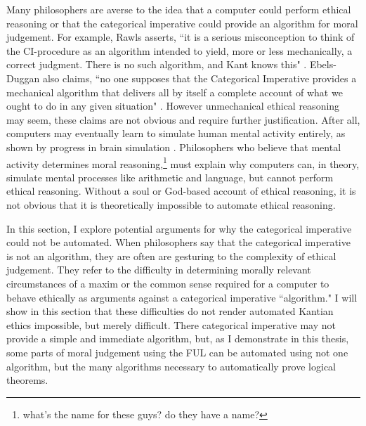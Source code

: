 %
\begin{isabellebody}%
%
%
\isadelimtheory
%
\endisadelimtheory
%
\isatagtheory
%
\endisatagtheory
{\isafoldtheory}%
%
\isadelimtheory
%
\endisadelimtheory
%
\isadelimdocument
%
\endisadelimdocument
%
\isatagdocument
%
\isamarkuptrue%
%
\endisatagdocument
{\isafolddocument}%
%
\isadelimdocument
%
\endisadelimdocument
%
\begin{isamarkuptext}%
Many philosophers are averse to the idea that a computer could perform ethical 
reasoning or that the categorical imperative could provide an algorithm for
moral judgement. For example, Rawls asserts, ``it is a serious misconception to think of the CI-procedure 
as an algorithm intended to yield, more or less mechanically, a correct judgment. There is no such 
algorithm, and Kant knows this" \citep[166]{rawlslectures}. Ebels-Duggan also claims, ``no one supposes that the Categorical
Imperative provides a mechanical algorithm that delivers all by itself a complete account of what we 
ought to do in any given situation" \citep[174]{ebelsduggan}. However unmechanical ethical reasoning
may seem, these claims are not obvious and require further justification. After all, computers may eventually 
learn to simulate human mental activity entirely, as shown by progress in brain simulation \citep{brainsimulation}. 
Philosophers who believe that mental activity determines moral reasoning,\footnote{what's the name for these
guys? do they have a name?} must explain why computers can, in theory, simulate mental processes like arithmetic 
and language, but cannot perform ethical reasoning. Without a soul or God-based account of ethical reasoning, 
it is not obvious that it is theoretically impossible to automate ethical reasoning. 

In this section,
I explore potential arguments for why the categorical imperative could not be automated. When 
philosophers say that the categorical imperative is not an algorithm, they are often are gesturing to the complexity
of ethical judgement. They refer to the difficulty in determining morally relevant circumstances of a maxim or the common 
sense required for a computer to behave ethically as arguments against a categorical imperative ``algorithm." 
I will show in this section that these difficulties do not render automated Kantian ethics impossible, but 
merely difficult. There categorical imperative may not provide a simple and immediate algorithm, but, as
I demonstrate in this thesis, some parts of moral judgement using the FUL can be automated using not one
algorithm, but the many algorithms necessary to automatically prove logical theorems.


\end{isamarkuptext}
\end{isabellebody}
